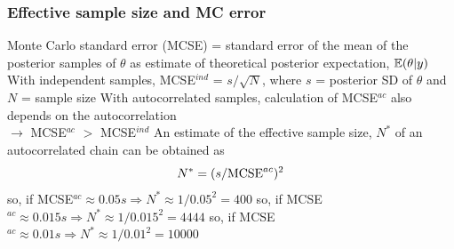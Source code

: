 \begin{frame}
\frametitle{Effective sample size and MC error}
\bibig
\I  Monte Carlo standard error (MCSE) = standard error of the mean of the posterior samples of $\theta$ as estimate of
      theoretical posterior expectation, $\mathbb{E}(\theta |y)$\vspace{2mm}
\I With independent samples, MCSE$^{ind}$ = $s / \sqrt{N}$,
where $s$ = posterior SD of $\theta$ and $N$ = sample size\vspace{2mm}
\I With autocorrelated samples, calculation of MCSE$^{ac}$ also depends on the autocorrelation\\\vspace{1mm}
$\rightarrow$ MCSE$^{ac}$ $>$ MCSE$^{ind}$\vspace{2mm}
\I An estimate of the \alert{effective sample size}, $N^*$ of an autocorrelated chain can be obtained as
$$N^* = (s/\hbox{MCSE}^{ac})^2$$\vspace{-3mm}
   \bibig
   \I so, if MCSE$^{ac} \approx 0.05 s \Rightarrow N^* \approx 1/0.05^2 = 400$\vspace{1mm}
   \I so, if MCSE$^{ac} \approx 0.015 s \Rightarrow N^* \approx 1/0.015^2 = 4444$\vspace{1mm}
   \I so, if MCSE$^{ac} \approx 0.01 s \Rightarrow N^* \approx 1/0.01^2 = 10000$
   \eibig
\eibig

\end{frame}

